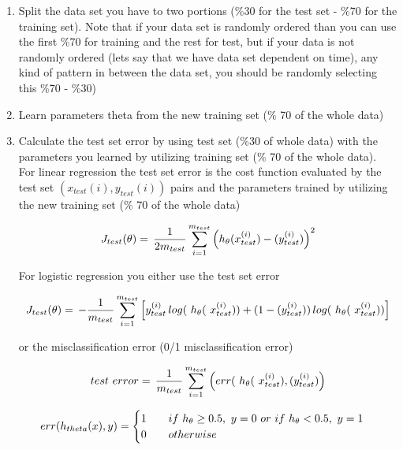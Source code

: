  \begin{enumerate}
 
  \item Split the data set you have to two portions 
  (\%30 for the test set - \%70 for the training set). 
  Note that if your data set is randomly ordered than you can 
  use the first \%70 for training and the rest for test, but if your 
  data is not randomly ordered (let\textquotesingle s say that we have data 
  set dependent on time), any kind of pattern in between 
  the data set, you should be randomly selecting this \%70 - \%30)
  
  \item Learn parameters theta from the new training set 
  (\% 70 of the whole data)

  \item Calculate the test set error by using test set 
  (\%30 of whole data) with the parameters you learned 
  by utilizing training set (\% 70 of the whole data).\\
  	For linear regression the test set error is the cost 
	function evaluated by the test set $(x_{test}(i), y_{test}(i))$ pairs 
	and the parameters trained by utilizing the new training set 
	(\% 70 of the whole data)
	
	\begin{equation}{\label{eqn:costFuncTest}}
	J_{test}(\theta)
	=\,
	\frac{1}{2m_{test}} \sum\limits_{i=1}^{m_{test}} \Big(h_\theta(x_{test}^{(i)}) - (y_{test}^{(i)})\Big)^2  
	\end{equation} 
	
	For logistic regression you either use the test set error
	
	\begin{equation}{\label{eqn:costFuncLogisticRegressionModified}}
	J_{test}(\theta)
	=\,
	-\frac{1}{m_{test}} \sum\limits_{i=1}^{m_{test}} \Big[y_{test}^{(i)}\,log(\ h_\theta(\ x_{test}^{(i)})) + (1-(y_{test}^{(i)}))\,log(\ h_\theta(\ x_{test}^{(i)}))\Big]
	\end{equation} 
	
	or the misclassification error (0/1 misclassification error)
	
	\begin{equation}{\label{eqn:errorMisclassificationError}}
	 test\ error
	=\,
	\frac{1}{m_{test}} \sum\limits_{i=1}^{m_{test}} \Big(err(\ h_\theta(\ x_{test}^{(i)}), (y_{test}^{(i)})\Big)  
	\end{equation} 

	\begin{equation}{\label{eqn:misclassificationError}}
	  err(h_{theta}(x),y)=\begin{cases}
               1 \qquad if\ h_{\theta}\geq0.5,\ y=0 \ or\ if \ h_{\theta} < 0.5, \ y=1\\
               0 \qquad otherwise\\
            \end{cases}
	\end{equation} 
		
\end{enumerate}

